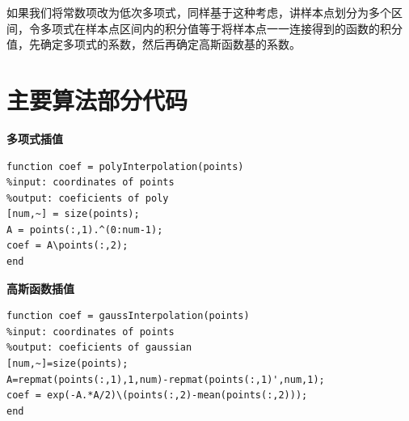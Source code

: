 \documentclass[12pt]{article}
\begin{document}
如果我们将常数项改为低次多项式，同样基于这种考虑，讲样本点划分为多个区间，令多项式在样本点区间内的积分值等于将样本点一一连接得到的函数的积分值，先确定多项式的系数，然后再确定高斯函数基的系数。

\newpage
\appendix
\section{主要算法部分代码}
\lstset{language=MATLAB}
{\bf 多项式插值}
\begin{lstlisting}
function coef = polyInterpolation(points)
%input: coordinates of points
%output: coeficients of poly
[num,~] = size(points);
A = points(:,1).^(0:num-1);
coef = A\points(:,2);
end
\end{lstlisting}

{\bf 高斯函数插值}
\begin{lstlisting}
function coef = gaussInterpolation(points)
%input: coordinates of points
%output: coeficients of gaussian
[num,~]=size(points);
A=repmat(points(:,1),1,num)-repmat(points(:,1)',num,1);
coef = exp(-A.*A/2)\(points(:,2)-mean(points(:,2)));
end
\end{lstlisting}
\end{document}

